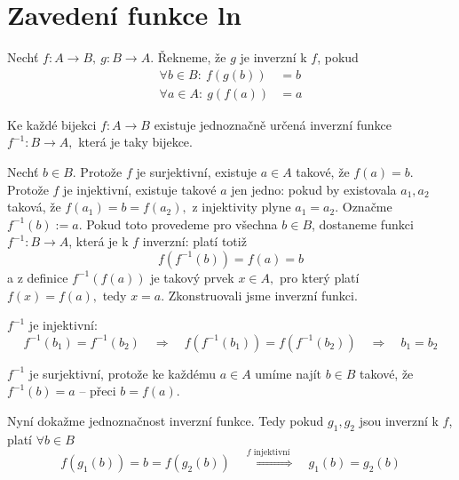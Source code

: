 
\section{Zavedení funkce ln}
\begin{definice}
  Nechť $f\colon A\to B,\ g\colon B\to A.$ Řekneme, že $g$ je inverzní k $f$, pokud
\begin{align*}
	  \forall b\in B\colon\ f(g(b))&=b \\
	  \forall a\in A\colon\ g(f(a))&=a
\end{align*}
\end{definice}

\begin{věta}
  Ke každé bijekci $f\colon A\to B$ existuje jednoznačně určená inverzní funkce $f^{-1}\colon B\to A,$ která je taky bijekce.
\end{věta}
\begin{důkaz}
  Nechť $b\in B.$ Protože $f$ je surjektivní, existuje $a\in A$ takové, že $f(a)=b.$ Protože $f$ je injektivní, existuje takové $a$ jen jedno: pokud by existovala $a_1,a_2$ taková, že $f(a_1)=b=f(a_2),$ z injektivity plyne $a_1=a_2.$ Označme $f^{-1}(b):=a.$ Pokud toto provedeme pro všechna $b\in B$, dostaneme funkci $f^{-1}\colon B\to A$, která je k $f$ inverzní: platí totiž
  \begin{equation*}
    f(f^{-1}(b))=f(a)=b
  \end{equation*}
  a z definice $f^{-1}(f(a))$ je takový prvek $x\in A,$ pro který platí $f(x)=f(a),$ tedy $x=a.$ Zkonstruovali jsme inverzní funkci.

  $f^{-1}$ je injektivní:
  \begin{equation*}
    f^{-1}(b_1)=f^{-1}(b_2) \quad \Rightarrow \quad f(f^{-1}(b_1))=f(f^{-1}(b_2))\quad \Rightarrow \quad b_1=b_2
  \end{equation*}

  $f^{-1}$ je surjektivní, protože ke každému $a\in A$ umíme najít $b\in B$ takové, že $f^{-1}(b)=a$ -- přeci $b=f(a).$

  Nyní dokažme jednoznačnost inverzní funkce. Tedy pokud $g_1, g_2$ jsou inverzní k $f$, platí $\forall b\in B$
\begin{equation*}
	f(g_1(b))=b=f(g_2(b)) \quad \stackrel{f \text{ injektivní }}{\Rightarrow} \quad g_1(b)=g_2(b)
\end{equation*}
\end{důkaz}

